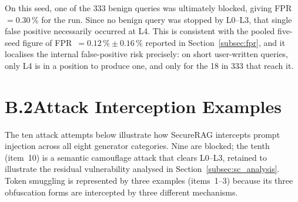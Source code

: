 \noindent
On this seed, one of the 333 benign queries was ultimately blocked, giving FPR~$=0.30\,\%$ for the run. Since no benign query was stopped by L0--L3, that single false positive necessarily occurred at L4. This is consistent with the pooled five-seed figure of FPR~$=0.12\,\%\pm0.16\,\%$ reported in Section~\ref{subsec:fpr}, and it localises the internal false-positive risk precisely: on short user-written queries, only L4 is in a position to produce one, and only for the 18 in 333 that reach it.

\section*{B.2\quad Attack Interception Examples}

The ten attack attempts below illustrate how SecureRAG intercepts prompt injection across all eight generator categories. Nine are blocked; the tenth (item~10) is a semantic camouflage attack that clears L0--L3, retained to illustrate the residual vulnerability analysed in Section~\ref{subsec:sc_analysis}. Token smuggling is represented by three examples (items~1--3) because its three obfuscation forms are intercepted by three different mechanisms.

